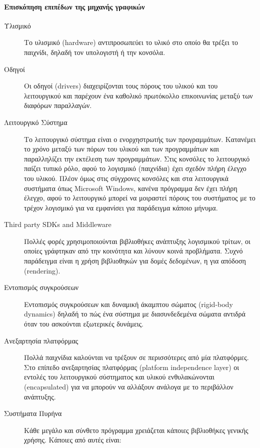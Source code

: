\paragraph{Επισκόπηση επιπέδων της μηχανής γραφικών}
\begin{description}	
\item [Υλισμικό]Το υλισμικό (hardware) αντιπροσωπεύει το υλικό στο οποίο θα τρέξει το παιχνίδι, δηλαδή τον υπολογιστή ή την κονσόλα.

\item [Οδηγοί]Οι οδηγοί (drivers) διαχειρίζονται τους πόρους του υλικού και του λειτουργικού και παρέχουν ένα καθολικό πρωτόκολλο επικοινωνίας μεταξύ των διαφόρων παραλλαγών.

\item [Λειτουργικό Σύστημα]Το λειτουργικό σύστημα είναι ο ενορχηστρωτής των προγραμμάτων. Κατανέμει το χρόνο μεταξύ των πόρων του υλικού και των προγραμμάτων και παραλληλίζει την εκτέλεση των προγραμμάτων. Στις κονσόλες το λειτουργικό παίζει τυπικό ρόλο, αφού το λογισμικό (παιχνίδια) έχει σχεδόν πλήρη έλεγχο του υλικού. Πλέον όμως στις σύγχρονες κονσόλες και στα λειτουργικά συστήματα όπως Microsoft Windows, κανένα πρόγραμμα δεν έχει πλήρη έλεγχο, αφού το λειτουργικό μπορεί να μοιραστεί πόρους του συστήματος με το τρέχον λογισμικό για να εμφανίσει για παράδειγμα κάποιο μήνυμα.

\item [Third party SDKs and Middleware]Πολλές φορές χρησιμοποιούνται βιβλιοθήκες ανάπτυξης λογισμικού τρίτων, οι οποίες γράφτηκαν από την κοινότητα και λύνουν κοινά προβλήματα. Συχνό παράδειγμα είναι η χρήση βιβλιοθηκών για δομές δεδομένων, η για απόδοση (rendering).

\item [Εντοπισμός συγκρούσεων]Εντοπισμός συγκρούσεων και δυναμική άκαμπτου σώματος (rigid-body dynamics) δηλαδή το πώς ένα σύστημα με διασυνδεδεμένα σώματα αντιδρά όταν του ασκούνται εξωτερικές δυνάμεις.

\item [Ανεξαρτησία πλατφόρμας]Πολλά παιχνίδια καλούνται να τρέξουν σε περισσότερες από μία πλατφόρμες. Στο επίπεδο ανεξαρτησίας πλατφόρμας (platform independence layer) οι εντολές του λειτουργικού σύστηματος  και υλικού ενθυλακώνονται (encapsulated) για να μπορούν να αλλάξουν ανάλογα με το περιβάλλον ανάπτυξης.

\item [Συστήματα Πυρήνα]Κάθε μεγάλο και σύνθετο πρόγραμμα χρειάζεται κάποιες βιβλιοθήκες γενικής χρήσης. Κάποιες από αυτές είναι: 


\end{description}
